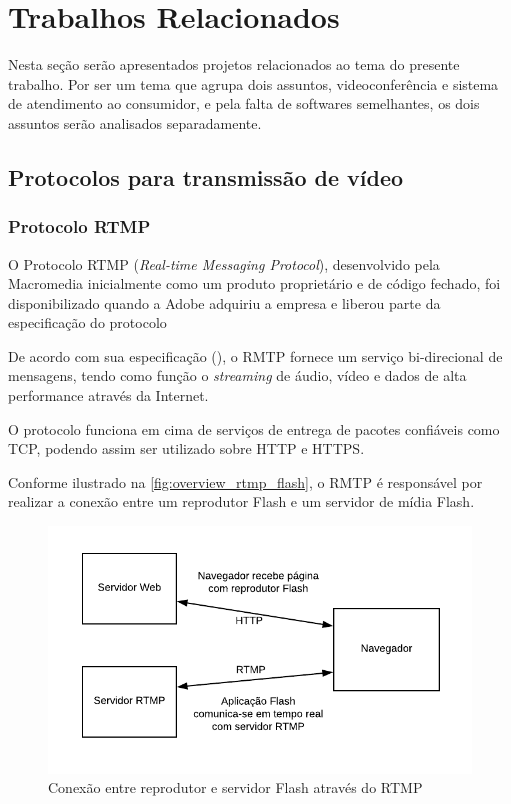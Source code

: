 \chapter[Trabalhos Relacionados]{Trabalhos Relacionados}\label{chap:relacionados}

Nesta seção serão apresentados projetos relacionados ao tema do presente trabalho. 
Por ser um tema que agrupa dois assuntos, videoconferência e sistema de atendimento ao consumidor, e pela falta de softwares semelhantes, os dois assuntos serão analisados separadamente.

\section{Protocolos para transmissão de vídeo}

\subsection{Protocolo RTMP}

O Protocolo RTMP (\textit{Real-time Messaging Protocol}), desenvolvido pela Macromedia inicialmente como um produto proprietário e de código fechado, foi disponibilizado quando a Adobe adquiriu a empresa e liberou parte da especificação do protocolo

De acordo com sua especificação (\cite{rtpmspec}), o RMTP fornece um serviço bi-direcional de mensagens, tendo como função o \textit{streaming} de áudio, vídeo e dados de alta performance através da Internet. 

O protocolo funciona em cima de serviços de entrega de pacotes confiáveis como TCP, podendo assim ser utilizado sobre HTTP e HTTPS.

Conforme ilustrado na \autoref{fig:overview_rtmp_flash}, o RMTP é responsável por realizar a conexão entre um reprodutor Flash e um servidor de mídia Flash. 

\begin{figure}[ht!]
	\centering
		\includegraphics[scale=1]{figures/overview-rtmp-flash.png} 
	\caption{Conexão entre reprodutor e servidor Flash através do RTMP}
	\label{fig:overview_rtmp_flash}
\end{figure}

